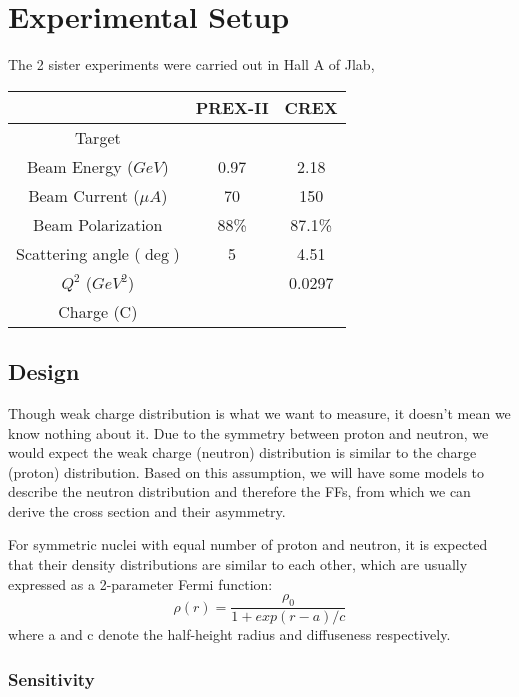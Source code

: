 \section{Experimental Setup}
The 2 sister experiments were carried out in Hall A of Jlab, 

\begin{table}
    \centering
    \begin{tabular}{c | c c }
	\hline
	&   PREX-II & CREX  \\
	\hline
	Target	& \Pb	& \Ca	\\
	Beam Energy ($GeV$) & 0.97 & 2.18  \\
	Beam Current ($\mu A$)	& 70	& 150	\\
	Beam Polarization & 88\%   & 87.1\%   \\
	Scattering angle ($\deg$)   & 5	& 4.51 \\
	$Q^2$ ($GeV^2$)	&   & 0.0297	\\
	\hline
	Charge (C)  &	&   \\
	\hline
    \end{tabular}
\end{table}

\subsection{Design}
Though weak charge distribution is what we want to measure, it doesn't mean we
know nothing about it. Due to the symmetry between proton and neutron, we would
expect the weak charge (neutron) distribution is similar to the charge (proton)
distribution. Based on this assumption, we will have some models to describe
the neutron distribution and therefore the FFs, from which we can derive the
cross section and their asymmetry.

For symmetric nuclei with equal number of proton and neutron, it is expected 
that their density distributions are similar to each other, which are usually
expressed as a 2-parameter Fermi function:
\begin{equation}
    \rho(r) = \frac{\rho_0}{1 + exp(r-a)/c}
\end{equation}
where a and c denote the half-height radius and diffuseness respectively. 

\subsubsection{Sensitivity}

